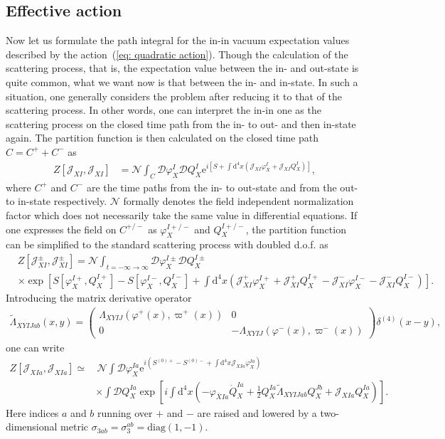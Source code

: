 \documentclass[a4paper,11pt]{article}
\newcommand{\dd}{\mathrm{d}}
\newcommand{\ee}{\mathrm{e}}
\newcommand{\diag}{\mathrm{diag}}
\newcommand{\scrD}{\mathscr{D}}
\newcommand{\calJ}{\mathcal{J}}
\newcommand{\scrJ}{\mathscr{J}}
\newcommand{\calN}{\mathcal{N}}
\newcommand{\bae}[1]{\begin{align} #1 \end{align}}
\newcommand{\bpme}[1]{\begin{pmatrix} #1 \end{pmatrix}}
\begin{document}
\subsection{Effective action}

Now let us formulate the path integral for the in-in vacuum expectation values described by the action~(\ref{eq: quadratic action}).
Though the calculation of the scattering process, that is, the expectation value between the in- and out-state is quite common,
what we want now is that between the in- and in-state. In such a situation, one generally considers the problem after reducing it to
that of the scattering process.
In other words, one can interpret the in-in one as the scattering process on the closed time path from the in- to out- and then in-state again.
The partition function is then calculated on the closed time path $C=C^++C^-$ as
\bae{
	Z[\calJ_{XI},\scrJ_{XI}]&=\calN\int_C\scrD\varphi_X^I\scrD Q_X^I\ee^{i\left[S+\int\dd^4x\left(\calJ_{XI}\varphi_X^I+\scrJ_{XI}Q_X^I\right)\right]},
}
where $C^+$ and $C^-$ are the time paths from the in- to out-state and from the out- to in-state respectively.
$\mathcal{N}$ formally denotes the field independent normalization factor which does not necessarily take the same value
in differential equations.
If one expresses the field on $C^{+/-}$ as $\varphi_X^{I+/-}$ and $Q_X^{I+/-}$, the partition function can be simplified to the standard 
scattering process with doubled d.o.f. as
\bae{
	&Z[\calJ_{XI}^\pm,\scrJ_{XI}^\pm]=\calN\int_{t=-\infty\to\infty}\scrD\varphi_X^{I\pm}\scrD Q_X^{I\pm} \nonumber \\
	&\times\exp\left[S[\varphi_X^{I+},Q_X^{I+}]
	-S[\varphi_X^{I-},Q_X^{I-}]+\int\dd^4x\left(\calJ_{XI}^+\varphi_X^{I+}+\scrJ_{XI}^+Q_X^{I+}-\calJ_{XI}^-\varphi_X^{I-}
	-\scrJ_{XI}^-Q_X^{I-}\right)\right].
}
Introducing the matrix derivative operator
\bae{
	\tilde{\Lambda}_{XYIJab}(x,y)=\bpme{
		\Lambda_{XYIJ}(\varphi^+(x),\varpi^+(x)) & 0 \\
		0 & -\Lambda_{XYIJ}(\varphi^-(x),\varpi^-(x))
	}\delta^{(4)}(x-y),
}
one can write
\bae{\label{eq: quadratic Z}
	Z[\calJ_{XIa},\scrJ_{XIa}]\simeq&\,\calN\int\scrD\varphi_X^{Ia}\ee^{i(S^{(0)+}-S^{(0)-}+\int\dd^4x\calJ_{XIa}\varphi_X^{Ia})} \nonumber \\
	&\times\int\scrD Q_X^{Ia}\exp\left[i\int\dd^4x\left(-\varphi_{\bar{X}Ia}\dot{Q}_{X}^{Ia}+\frac{1}{2}Q_{X}^{Ia}\tilde{\Lambda}_{XYIJab}Q_X^{Jb}
	+\scrJ_{XIa}Q_X^{Ia}\right)\right].
}
Here indices $a$ and $b$ running over $+$ and $-$ are raised and lowered by a two-dimensional metric $\sigma_{3ab}=\sigma_3^{ab}=\diag(1,-1)$.
\end{document}
